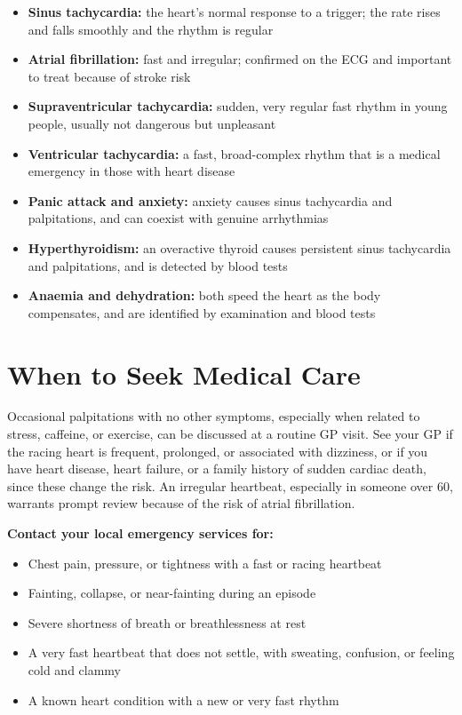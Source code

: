 \begin{itemize}
    \item \textbf{Sinus tachycardia:} the heart's normal response to a trigger; the rate rises and falls smoothly and the rhythm is regular
    \item \textbf{Atrial fibrillation:} fast and irregular; confirmed on the ECG and important to treat because of stroke risk
    \item \textbf{Supraventricular tachycardia:} sudden, very regular fast rhythm in young people, usually not dangerous but unpleasant
    \item \textbf{Ventricular tachycardia:} a fast, broad-complex rhythm that is a medical emergency in those with heart disease
    \item \textbf{Panic attack and anxiety:} anxiety causes sinus tachycardia and palpitations, and can coexist with genuine arrhythmias
    \item \textbf{Hyperthyroidism:} an overactive thyroid causes persistent sinus tachycardia and palpitations, and is detected by blood tests
    \item \textbf{Anaemia and dehydration:} both speed the heart as the body compensates, and are identified by examination and blood tests
\end{itemize}

\section*{When to Seek Medical Care}
Occasional palpitations with no other symptoms, especially when related to stress, caffeine, or exercise, can be discussed at a routine GP visit. See your GP if the racing heart is frequent, prolonged, or associated with dizziness, or if you have heart disease, heart failure, or a family history of sudden cardiac death, since these change the risk. An irregular heartbeat, especially in someone over 60, warrants prompt review because of the risk of atrial fibrillation.

\textbf{Contact your local emergency services for:}
\begin{itemize}
    \item Chest pain, pressure, or tightness with a fast or racing heartbeat
    \item Fainting, collapse, or near-fainting during an episode
    \item Severe shortness of breath or breathlessness at rest
    \item A very fast heartbeat that does not settle, with sweating, confusion, or feeling cold and clammy
    \item A known heart condition with a new or very fast rhythm
\end{itemize}


